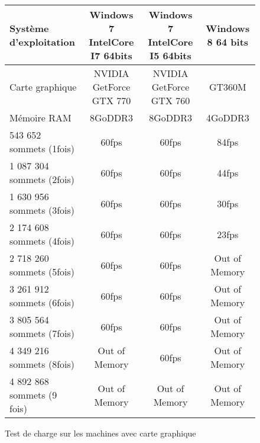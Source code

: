 \begin{figure}[h]
  \begin{changemargin}{-4cm}{-4cm}
    \centering
    \begin{tabular}{|l|c|c|c|}
      \hline
      Système d'exploitation & Windows 7 IntelCore I7 64bits & Windows 7 IntelCore I5 64bits & Windows 8 64 bits\\ \hline
      Carte graphique &  NVIDIA GetForce GTX 770 & NVIDIA GetForce GTX 760 & GT360M\\ \hline
      Mémoire RAM & 8GoDDR3 & 8GoDDR3 & 4GoDDR3 \\ \hline \hline
      543 652 sommets (1fois) & 60fps & 60fps & 84fps \\ \hline
      1 087 304 sommets (2fois) & 60fps & 60fps & 44fps \\ \hline
      1 630 956 sommets (3fois) & 60fps & 60fps & 30fps \\ \hline
      2 174 608 sommets (4fois) & 60fps & 60fps & 23fps \\ \hline
      2 718 260 sommets (5fois) & 60fps & 60fps & Out of Memory \\ \hline
      3 261 912 sommets (6fois) & 60fps & 60fps & Out of Memory \\ \hline
      3 805 564 sommets (7fois) & 60fps & 60fps & Out of Memory \\ \hline
      4 349 216 sommets (8fois) & Out of Memory & 60fps & Out of Memory  \\ \hline
      4 892 868 sommets (9 fois) & Out of Memory & Out of Memory & Out of Memory \\ \hline
    \end{tabular}
  \end{changemargin}
  \caption{Test de charge sur les machines avec carte graphique}
  \label{tab:fps_cg}
\end{figure}

